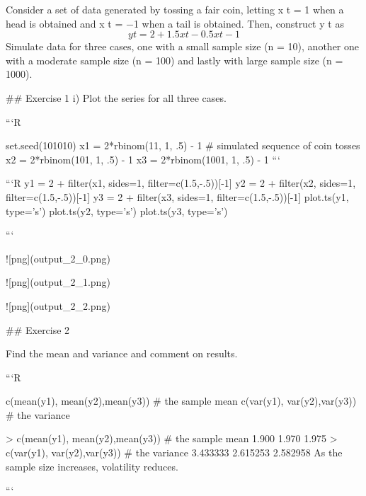 \documentclass[a4paper,12pt]{article}
\begin{document}
Consider a set of data generated by tossing a fair coin, letting x t = 1 when a head is obtained
and x t = −1 when a tail is obtained. Then, construct y t as
$$y t = 2 + 1.5x t − 0.5x t−1$$
Simulate data for three cases, one with a small sample size (n = 10), another one with a
moderate sample size (n = 100) and lastly with large sample size (n = 1000).


## Exercise 1
i) Plot the series for all three cases.



```R

set.seed(101010)
x1 = 2*rbinom(11, 1, .5) - 1 # simulated sequence of coin tosses
x2 = 2*rbinom(101, 1, .5) - 1
x3 = 2*rbinom(1001, 1, .5) - 1
```


```R
y1 = 2 + filter(x1, sides=1, filter=c(1.5,-.5))[-1]
y2 = 2 + filter(x2, sides=1, filter=c(1.5,-.5))[-1]
y3 = 2 + filter(x3, sides=1, filter=c(1.5,-.5))[-1]
plot.ts(y1, type='s')
plot.ts(y2, type='s')
plot.ts(y3, type='s')





```


![png](output_2_0.png)



![png](output_2_1.png)



![png](output_2_2.png)


## Exercise 2 

Find the mean and variance and comment on results.




```R



c(mean(y1), mean(y2),mean(y3)) # the sample mean
c(var(y1), var(y2),var(y3)) # the variance


> c(mean(y1), mean(y2),mean(y3)) # the sample mean
 1.900 1.970 1.975
> c(var(y1), var(y2),var(y3)) # the variance
 3.433333 2.615253 2.582958
As the sample size increases, volatility reduces.

```
\end{document}
